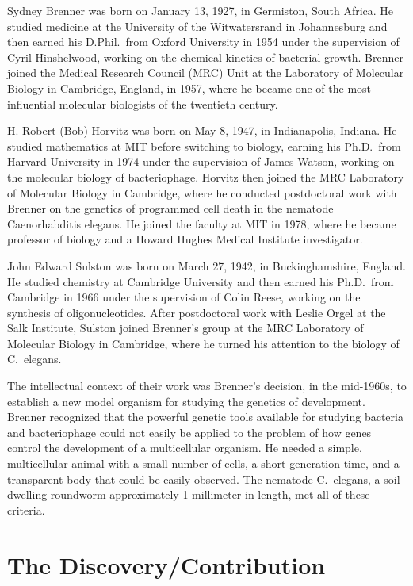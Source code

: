 Sydney Brenner was born on January 13, 1927, in Germiston, South Africa. He studied medicine at the University of the Witwatersrand in Johannesburg and then earned his D.Phil.\ from Oxford University in 1954 under the supervision of Cyril Hinshelwood, working on the chemical kinetics of bacterial growth. Brenner joined the Medical Research Council (MRC) Unit at the Laboratory of Molecular Biology in Cambridge, England, in 1957, where he became one of the most influential molecular biologists of the twentieth century.

H. Robert (Bob) Horvitz was born on May 8, 1947, in Indianapolis, Indiana. He studied mathematics at MIT before switching to biology, earning his Ph.D.\ from Harvard University in 1974 under the supervision of James Watson, working on the molecular biology of bacteriophage. Horvitz then joined the MRC Laboratory of Molecular Biology in Cambridge, where he conducted postdoctoral work with Brenner on the genetics of programmed cell death in the nematode Caenorhabditis elegans. He joined the faculty at MIT in 1978, where he became professor of biology and a Howard Hughes Medical Institute investigator.

John Edward Sulston was born on March 27, 1942, in Buckinghamshire, England. He studied chemistry at Cambridge University and then earned his Ph.D.\ from Cambridge in 1966 under the supervision of Colin Reese, working on the synthesis of oligonucleotides. After postdoctoral work with Leslie Orgel at the Salk Institute, Sulston joined Brenner's group at the MRC Laboratory of Molecular Biology in Cambridge, where he turned his attention to the biology of C.\ elegans.

The intellectual context of their work was Brenner's decision, in the mid-1960s, to establish a new model organism for studying the genetics of development. Brenner recognized that the powerful genetic tools available for studying bacteria and bacteriophage could not easily be applied to the problem of how genes control the development of a multicellular organism. He needed a simple, multicellular animal with a small number of cells, a short generation time, and a transparent body that could be easily observed. The nematode C.\ elegans, a soil-dwelling roundworm approximately 1 millimeter in length, met all of these criteria.

\section{The Discovery/Contribution}

